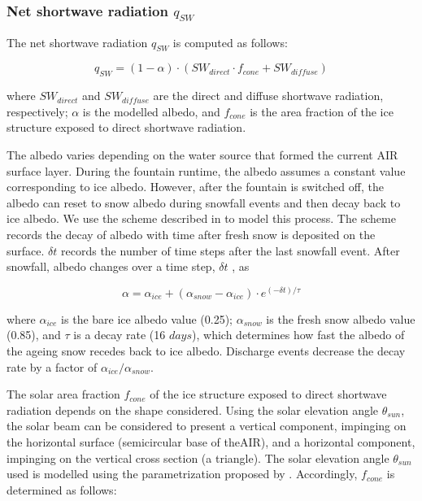 \subsubsection{Net shortwave radiation \texorpdfstring{$q_{SW}$}{Lg}}

The net shortwave radiation $q_{SW}$ is computed as follows:

\begin{equation} q_{SW} = (1- \alpha)\cdot (SW_{direct} \cdot f_{cone} + SW_{diffuse}) \label{eqn:SW} \end{equation}

where $SW_{direct}$ and $SW_{diffuse}$ are the direct and diffuse shortwave radiation, respectively; $\alpha$ is the
modelled albedo, and $f_{cone}$ is the area fraction of the ice structure exposed to direct shortwave
radiation.

The albedo varies depending on the water source that formed the current \ac{AIR} surface layer. During the fountain
runtime, the albedo assumes a constant value corresponding to ice albedo. However, after the fountain is
switched off, the albedo can reset to snow albedo during snowfall events and then decay back to ice albedo. We
use the scheme described in \cite{oerlemansYearRecordGlobal1998} to model this process. The scheme records the
decay of albedo with time after fresh snow is deposited on the surface. $\delta t$ records the number of time
steps after the last snowfall event. After snowfall, albedo changes over a time step, $\delta t$ , as

\begin{equation} \alpha=\alpha_{ice}+(\alpha_{snow}-\alpha_{ice}) \cdot e^{(-\delta t)/\tau} \label{eqn:alb}
\end{equation}

where $\alpha_{ice}$ is the bare ice albedo value (0.25); $\alpha_{snow}$ is the fresh snow albedo value (0.85),
and $\tau$ is a decay rate (16 $days$), which determines how fast the albedo of the ageing snow recedes back to
ice albedo. Discharge events decrease the decay rate by a factor of $\alpha_{ice}/\alpha_{snow}$.

The solar area fraction $f_{cone}$ of the ice structure exposed to direct shortwave radiation depends on the shape
considered. Using the solar elevation angle $\theta_{sun}$, the solar beam can be considered to present a vertical
component, impinging on the horizontal surface (semicircular base of the\ac{AIR}), and a horizontal component,
impinging on the vertical cross section (a triangle). The solar elevation angle $\theta_{sun}$ used is modelled
using the parametrization proposed by \cite{woolfComputationSolarElevation1968}. Accordingly, $f_{cone}$ is determined as follows:

